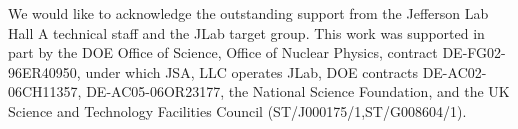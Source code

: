 \documentclass[aps,prl,superscriptaddress,showpacs,twocolumn,floatfix,amsmath,amssymb]{revtex4-1}
\begin{document}

\begin{acknowledgments}

We would like to acknowledge the outstanding support from the Jefferson Lab Hall A technical staff and the
JLab target group. This work was supported in part by the DOE Office of Science, Office of Nuclear Physics,
contract DE-FG02-96ER40950, under which JSA, LLC operates JLab, DOE contracts DE-AC02-06CH11357,
DE-AC05-06OR23177, the National Science Foundation, and the UK Science and Technology Facilities Council
(ST/J000175/1,ST/G008604/1).

\end{acknowledgments}

%


\end{document}
